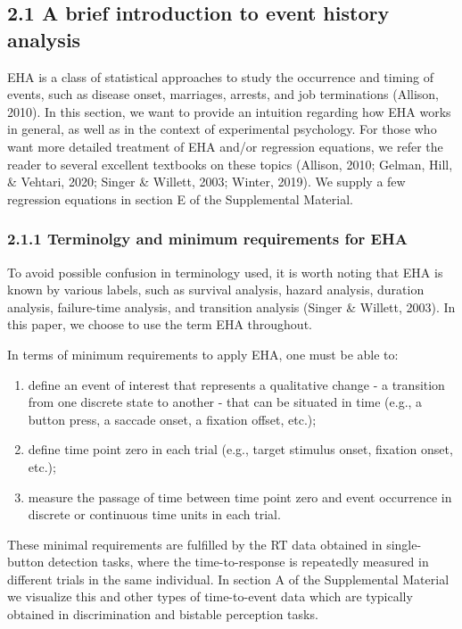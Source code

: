 \documentclass[
  man, donotrepeattitle,floatsintext]{apa6}
\begin{document}
\subsection{2.1 A brief introduction to event history analysis}\label{a-brief-introduction-to-event-history-analysis}

EHA is a class of statistical approaches to study the occurrence and timing of events, such as disease onset, marriages, arrests, and job terminations (Allison, 2010). In this section, we want to provide an intuition regarding how EHA works in general, as well as in the context of experimental psychology. For those who want more detailed treatment of EHA and/or regression equations, we refer the reader to several excellent textbooks on these topics (Allison, 2010; Gelman, Hill, \& Vehtari, 2020; Singer \& Willett, 2003; Winter, 2019). We supply a few regression equations in section E of the Supplemental Material.

\subsubsection{2.1.1 Terminolgy and minimum requirements for EHA}\label{terminolgy-and-minimum-requirements-for-eha}

To avoid possible confusion in terminology used, it is worth noting that EHA is known by various labels, such as survival analysis, hazard analysis, duration analysis, failure-time analysis, and transition analysis (Singer \& Willett, 2003). In this paper, we choose to use the term EHA throughout.

In terms of minimum requirements to apply EHA, one must be able to:

\begin{enumerate}
\def\labelenumi{\arabic{enumi}.}
\item
  define an event of interest that represents a qualitative change - a transition from one discrete state to another - that can be situated in time (e.g., a button press, a saccade onset, a fixation offset, etc.);
\item
  define time point zero in each trial (e.g., target stimulus onset, fixation onset, etc.);
\item
  measure the passage of time between time point zero and event occurrence in discrete or continuous time units in each trial.
\end{enumerate}

These minimal requirements are fulfilled by the RT data obtained in single-button detection tasks, where the time-to-response is repeatedly measured in different trials in the same individual. In section A of the Supplemental Material we visualize this and other types of time-to-event data which are typically obtained in discrimination and bistable perception tasks.
\end{document}
